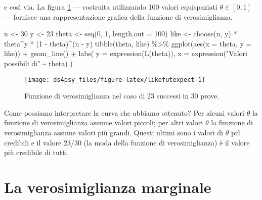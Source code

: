 \documentclass[
]{book}
\newenvironment{Shaded}{\begin{snugshade}}{\end{snugshade}}
\newcommand{\AttributeTok}[1]{\textcolor[rgb]{0.77,0.63,0.00}{#1}}
\newcommand{\DecValTok}[1]{\textcolor[rgb]{0.00,0.00,0.81}{#1}}
\newcommand{\FunctionTok}[1]{\textcolor[rgb]{0.00,0.00,0.00}{#1}}
\newcommand{\NormalTok}[1]{#1}
\newcommand{\OtherTok}[1]{\textcolor[rgb]{0.56,0.35,0.01}{#1}}
\newcommand{\SpecialCharTok}[1]{\textcolor[rgb]{0.00,0.00,0.00}{#1}}
\newcommand{\StringTok}[1]{\textcolor[rgb]{0.31,0.60,0.02}{#1}}
\theoremstyle{definition}
\theoremstyle{definition}
\theoremstyle{definition}
\theoremstyle{definition}
\theoremstyle{remark}
\begin{document}
e così via. La figura \ref{fig:likefutexpect} --- costruita utilizzando 100 valori equispaziati \(\theta \in [0, 1]\) --- fornisce una rappresentazione grafica della funzione di verosimiglianza.

\begin{Shaded}
\begin{Highlighting}[]
\NormalTok{n }\OtherTok{\textless{}{-}} \DecValTok{30}
\NormalTok{y }\OtherTok{\textless{}{-}} \DecValTok{23}
\NormalTok{theta }\OtherTok{\textless{}{-}} \FunctionTok{seq}\NormalTok{(}\DecValTok{0}\NormalTok{, }\DecValTok{1}\NormalTok{, }\AttributeTok{length.out =} \DecValTok{100}\NormalTok{)}
\NormalTok{like }\OtherTok{\textless{}{-}} \FunctionTok{choose}\NormalTok{(n, y) }\SpecialCharTok{*}\NormalTok{ theta}\SpecialCharTok{\^{}}\NormalTok{y }\SpecialCharTok{*}\NormalTok{ (}\DecValTok{1} \SpecialCharTok{{-}}\NormalTok{ theta)}\SpecialCharTok{\^{}}\NormalTok{(n }\SpecialCharTok{{-}}\NormalTok{ y)}
\FunctionTok{tibble}\NormalTok{(theta, like) }\SpecialCharTok{\%\textgreater{}\%}
  \FunctionTok{ggplot}\NormalTok{(}\FunctionTok{aes}\NormalTok{(}\AttributeTok{x =}\NormalTok{ theta, }\AttributeTok{y =}\NormalTok{ like)) }\SpecialCharTok{+}
  \FunctionTok{geom\_line}\NormalTok{() }\SpecialCharTok{+}
  \FunctionTok{labs}\NormalTok{(}
    \AttributeTok{y =} \FunctionTok{expression}\NormalTok{(}\FunctionTok{L}\NormalTok{(theta)),}
    \AttributeTok{x =} \FunctionTok{expression}\NormalTok{(}\StringTok{"Valori possibili di"} \SpecialCharTok{\textasciitilde{}}\NormalTok{ theta)}
\NormalTok{  )}
\end{Highlighting}
\end{Shaded}

\begin{figure}

{\centering \texttt{[image: ds4psy\_files/figure-latex/likefutexpect-1]} 

}

\caption{Funzione di verosimiglianza nel caso di 23 successi in 30 prove.}\label{fig:likefutexpect}
\end{figure}

Come possiamo interpretare la curva che abbiamo ottenuto? Per alcuni valori \(\theta\) la funzione di verosimiglianza assume valori piccoli; per altri valori \(\theta\) la funzione di verosimiglianza assume valori più grandi. Questi ultimi sono i valori di \(\theta\) più credibili e il valore 23/30 (la moda della funzione di verosimiglianza) è il valore più credibile di tutti.

\hypertarget{sec:const-normaliz-bino23}{%
\section{La verosimiglianza marginale}\label{sec:const-normaliz-bino23}}
\end{document}
